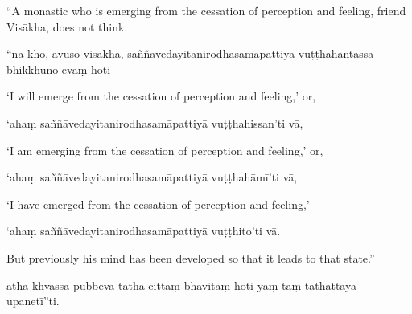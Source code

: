 \begin{samepage}
\begin{leftcolumn*}
“A monastic who is emerging from the cessation of perception and feeling, friend Visākha, does not think:
\end{leftcolumn*}

\begin{rightcolumn}
“na kho, āvuso visākha, saññāvedayitanirodhasamāpattiyā vuṭṭhahantassa bhikkhuno evaṃ hoti —
\end{rightcolumn}
\end{samepage}

\begin{samepage}
\begin{leftcolumn*}
‘I will emerge from the cessation of perception and feeling,’ or,
\end{leftcolumn*}

\begin{rightcolumn}
‘ahaṃ saññāvedayitanirodhasamāpattiyā vuṭṭhahissan’ti vā,
\end{rightcolumn}
\end{samepage}

\begin{samepage}
\begin{leftcolumn*}
‘I am emerging from the cessation of perception and feeling,’ or,
\end{leftcolumn*}

\begin{rightcolumn}
‘ahaṃ saññāvedayitanirodhasamāpattiyā vuṭṭhahāmī’ti vā,
\end{rightcolumn}
\end{samepage}

\begin{samepage}
\begin{leftcolumn*}
‘I have emerged from the cessation of perception and feeling,’
\end{leftcolumn*}

\begin{rightcolumn}
‘ahaṃ saññāvedayitanirodhasamāpattiyā vuṭṭhito’ti vā.
\end{rightcolumn}
\end{samepage}

\begin{samepage}
\begin{leftcolumn*}
But previously his mind has been developed so that it leads to that state.”
\end{leftcolumn*}

\begin{rightcolumn}
atha khvāssa pubbeva tathā cittaṃ bhāvitaṃ hoti yaṃ taṃ tathattāya upanetī”ti.
\end{rightcolumn}
\end{samepage}


